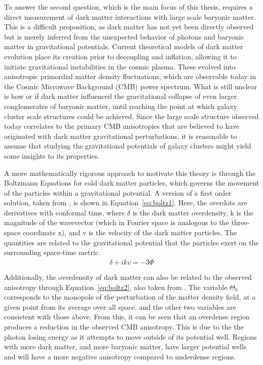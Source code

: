 \documentclass[manuscript]{aastex}
\begin{document}
To answer the second question, which is the main focus of this thesis, requires a direct measurement of dark matter interactions with large scale baryonic matter. This is a difficult proposition, as dark matter has not yet been directly observed but is merely inferred from the unexpected behavior of photons and baryonic matter in gravitational potentials. Current theoretical models of dark matter evolution place its creation prior to decoupling and inflation, allowing it to initiate gravitational instabilities in the cosmic plasma. These evolved into anisotropic primordial matter density fluctuations, which are observable today in the Cosmic Microwave Background (CMB) power spectrum. What is still unclear is how or if dark matter influenced the gravitational collapse of even larger conglomerates of baryonic matter, until reaching the point at which galaxy cluster scale structures could be achieved. Since the large scale structure observed today correlates to the primary CMB anisotropies that are believed to have originated with dark matter gravitational perturbations, it is reasonable to assume that studying the gravitational potentials of galaxy clusters might yield some insights to its properties. 

A more mathematically rigorous approach to motivate this theory is through the Boltzmann Equations for cold dark matter particles, which governs the movement of the particles within a gravitational potential. A version of a first order solution, taken from \cite{Dodelson2003}, is shown in Equation~\ref{eq:boltz1}. Here, the overdots are derivatives with conformal time, where \(\delta\) is the dark matter overdensity, k is the magnitude of the wavevector (which in Fourier space is analogous to the three-space coordinate x), and v is the velocity of the dark matter particles. The quantities are related to the gravitational potential that the particles exert on the surrounding space-time metric.
\begin{equation}\label{eq:boltz1}
\dot{\delta} + ikv = -3\dot{\Phi}
\end{equation}

Additionally, the overdensity of dark matter can also be related to the observed anisotropy through Equation~\ref{eq:boltz2}, also taken from \cite{Dodelson2003}. The variable \(\Theta_{0}\) corresponds to the monopole of the perturbation of the matter density field, at a given point from its average over all space, and the other two variables are consistent with those above. From this, it can be seen that an overdense region produces a reduction in the observed CMB anisotropy. This is due to the the photon losing energy as it attempts to move outside of its potential well. Regions with more dark matter, and more baryonic matter, have larger potential wells and will have a more negative anisotropy compared to underdense regions. 
\end{document}
